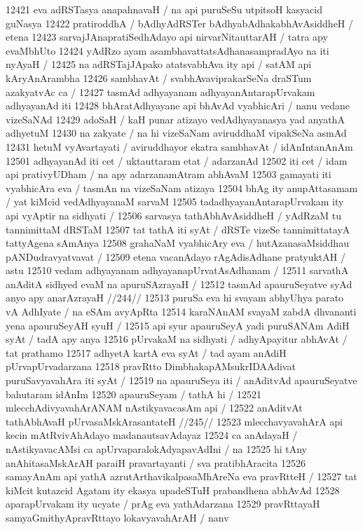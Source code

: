 12421 eva adRSTasya anapahnavaH / na api puruSeSu utpitsoH kasyacid guNasya  
12422 pratiroddhA / bAdhyAdRSTer bAdhyabAdhakabhAvAsiddheH / etena  
12423 sarvajJAnapratiSedhAdayo api nirvarNitauttarAH / tatra apy evaMbhUto
12424 yAdRzo ayam asambhavattatsAdhanasampradAyo na iti nyAyaH /
12425 na adRSTajJApako atatsvabhAva ity api / satAM api kAryAnArambha 
12426 sambhavAt / svabhAvaviprakarSeNa draSTum azakyatvAc ca /  
12427 tasmAd adhyayanam adhyayanAntarapUrvakam adhyayanAd iti 
12428 bhAratAdhyayane api bhAvAd vyabhicAri / nanu vedane vizeSaNAd
12429 adoSaH / kaH punar atizayo vedAdhyayanasya yad anyathA adhyetuM  
12430 na zakyate / na hi vizeSaNam aviruddhaM vipakSeNa asmAd
12431 hetuM vyAvartayati / aviruddhayor ekatra sambhavAt / idAnIntanAnAm  
12501 adhyayanAd iti cet / uktauttaram etat / adarzanAd 
12502 iti cet / idam api prativyUDham / na apy adarzanamAtram abhAvaM 
12503 gamayati iti vyabhicAra eva / tasmAn na vizeSaNam atizaya  
12504 bhAg ity anupAttasamam / yat kiMcid vedAdhyayanaM sarvaM 
12505 tadadhyayanAntarapUrvakam ity api vyAptir na sidhyati / 
12506 sarvasya tathAbhAvAsiddheH / yAdRzaM tu tannimittaM dRSTaM 
12507 tat tathA iti syAt / dRSTe vizeSe tannimittatayA tattyAgena sAmAnya
12508 grahaNaM vyabhicAry eva / hutAzanasaMsiddhau pANDudravyatvavat /  
12509 etena vacanAdayo rAgAdisAdhane pratyuktAH / astu 
12510 vedam adhyayanam adhyayanapUrvatAsAdhanam /  
12511 	sarvathA anAditA sidhyed evaM na apuruSAzrayaH /
12512 	tasmAd apauruSeyatve syAd anyo apy anarAzrayaH //244// 
12513 puruSa eva hi svayam abhyUhya parato vA AdhIyate / na eSAm avyApRta
12514 karaNAnAM svayaM zabdA dhvananti yena apauruSeyAH syuH /  
12515 api syur apauruSeyA yadi puruSANAm AdiH syAt / tadA apy anya 
12516 pUrvakaM na sidhyati / adhyApayitur abhAvAt / tat prathamo
12517 adhyetA kartA eva syAt / tad ayam anAdiH pUrvapUrvadarzana 
12518 pravRtto DimbhakapAMsukrIDAAdivat puruSavyavahAra iti syAt / 
12519 na apauruSeya iti / anAditvAd apauruSeyatve bahutaram idAnIm 
12520 apauruSeyam / tathA hi / 
12521 	mlecchAdivyavahArANAM nAstikyavacasAm api / 
12522 	anAditvAt tathAbhAvaH pUrvasaMskArasantateH //245// 
12523 mlecchavyavahArA api kecin mAtRvivAhAdayo madanautsavAdayaz  
12524 ca anAdayaH / nAstikyavacAMsi ca apUrvaparalokAdyapavAdIni / na
12525 hi tAny anAhitasaMskArAH paraiH pravartayanti / sva pratibhAracita
12526 samayAnAm api yathA azrutArthavikalpasaMhAreNa eva pravRtteH / 
12527 tat kiMcit kutazcid Agatam ity ekasya upadeSTuH prabandhena abhAvAd 
12528 aparapUrvakam ity ucyate / prAg eva yathAdarzana  
12529 pravRttayaH samyaGmithyApravRttayo lokavyavahArAH / nanv
